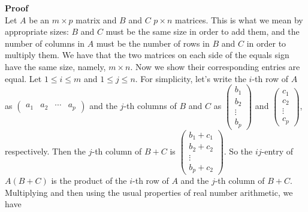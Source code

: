 \documentclass[12pt]{article}
\begin{document}
{\bf Proof} \\
Let $A$ be an $m \times p$ matrix and $B$ and $C$ $p \times n$ matrices. This is what we mean by appropriate sizes: $B$ and $C$ must be the same size in order to add them, and the number of columns in $A$ must be the number of rows in $B$ and $C$ in order to multiply them. We have that the two matrices on each side of the equals sign have the same size, namely, $m \times n$. Now we show their corresponding entries are equal. Let $1 \leq i \leq m$ and $1 \leq j \leq n$. For simplicity, let's write the $i$-th row of $A$ as $\begin{pmatrix} a_1 & a_2 & \cdots & a_p \end{pmatrix}$ and the $j$-th columns of $B$ and $C$ as
$\begin{pmatrix} b_1 \\ b_2 \\ \vdots \\ b_p \end{pmatrix}$ and $\begin{pmatrix} c_1 \\ c_2 \\ \vdots \\ c_p \end{pmatrix}$, respectively. Then the $j$-th column of $B + C$ is $\begin{pmatrix} b_1 + c_1 \\ b_2 +c_2 \\ \vdots \\ b_p + c_2 \end{pmatrix}$. So the $ij$-entry of $A(B + C)$ is the product of the $i$-th row of $A$ and the $j$-th column of $B+C$. Multiplying and then using the usual properties of real number arithmetic, we have 
\end{document}
